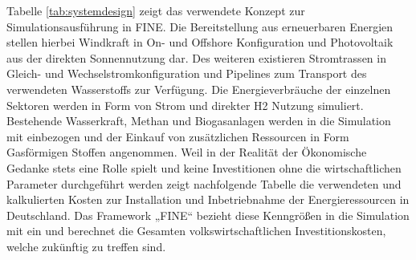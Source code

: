 Tabelle \ref{tab:systemdesign} zeigt das verwendete Konzept zur Simulationsausführung in FINE. Die Bereitstellung aus erneuerbaren Energien stellen hierbei Windkraft in On- und Offshore Konfiguration und Photovoltaik aus der direkten Sonnennutzung dar. Des weiteren existieren
Stromtrassen in Gleich- und Wechselstromkonfiguration und Pipelines zum Transport des verwendeten Wasserstoffs zur Verfügung. Die Energieverbräuche der einzelnen Sektoren werden in Form von Strom und direkter H2 Nutzung simuliert. Bestehende Wasserkraft, Methan und Biogasanlagen werden in die Simulation mit einbezogen und der Einkauf von
zusätzlichen Ressourcen in Form Gasförmigen Stoffen angenommen. Weil in der Realität der Ökonomische Gedanke stets eine Rolle spielt und keine Investitionen ohne die wirtschaftlichen Parameter durchgeführt werden zeigt nachfolgende Tabelle  die verwendeten und kalkulierten Kosten zur Installation und Inbetriebnahme der Energieressourcen in Deutschland. Das Framework „FINE“ bezieht diese Kenngrößen in die Simulation mit ein und berechnet die Gesamten volkswirtschaftlichen Investitionskosten, welche zukünftig zu treffen sind. 


